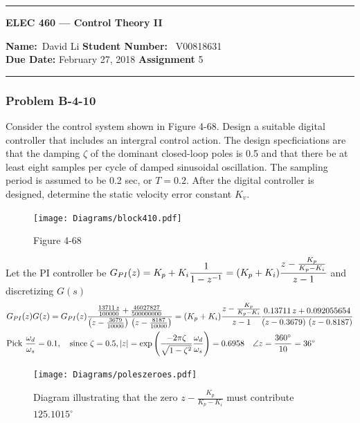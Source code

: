 \begin{center}
	\hrule
	\vspace{.4cm}
	{\textbf { \large ELEC 460 --- Control Theory II}}
\end{center}
{\textbf{Name:}\ David Li \hspace{\fill} \textbf{Student Number:} \ V00818631  \\}
{\textbf{Due Date:} February 27, 2018 \hspace{\fill} \textbf{Assignment}  5}\\
\hrule
\subsubsection*{Problem B-4-10}
Consider the control system shown in Figure 4-68. Design a suitable digital controller that includes an intergral control action. The design specficiations are that the damping $\zeta$ of the dominant closed-loop poles is 0.5 and that there be at least eight samples per cycle of damped sinusoidal oscillation. The sampling period is assumed to be 0.2 sec, or $T=0.2$. After the digital controller is designed, determine the static velocity error constant $K_v$.
\begin{figure}[H]
	\centering
	\texttt{[image: Diagrams/block410.pdf]}
	\caption*{Figure 4-68}
	\label{fig:samplerblock413}
\end{figure}
Let the PI controller be $\displaystyle G_{PI}(z)=K_p+K_i\frac{1}{1-z^{-1}}=(K_p+K_i)\cfrac{z-\frac{K_p}{K_p-K_i}}{z-1}$ and discretizing $G(s)$
\begin{align*}
& G_{PI}(z)G(z)=G_{PI}(z)\frac{\frac{13711\,z}{100000}+\frac{46027827}{500000000}}{\left(z-\frac{3679}{10000}\right)\,\left(z-\frac{8187}{10000}\right)}=(K_p+K_i)\cfrac{z-\frac{K_p}{K_p-K_i}}{z-1}\frac{0.13711\,z+0.092055654}{\left(z-0.3679\right)\,\left(z-0.8187\right)} \\
& \text{Pick } \frac{\omega_d}{\omega_s}=0.1, \quad \text{since } \zeta=0.5, |z| = \exp \left(\frac{-2\pi \zeta}{\sqrt{1-\zeta^2}}\frac{\omega_d}{\omega_s} \right)=0.6958 \quad \angle z = \frac{360^\circ}{10}= 36^\circ %
\end{align*}

\begin{figure}[H]
	\centering
	\texttt{[image: Diagrams/poleszeroes.pdf]}
	\caption{Diagram illustrating that the zero $z-\frac{K_p}{K_p-K_i}$ must contribute $125.1015^\circ$}
	\label{fig:polesZeroess}
\end{figure}


